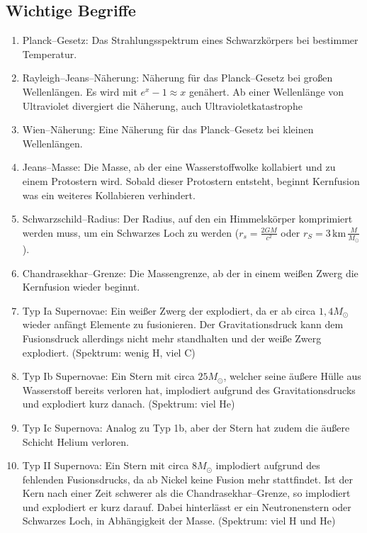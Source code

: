 \documentclass[a4paper,12pt]{article}
\numberwithin{equation}{section}
\begin{document}

\newpage


\subsection{Wichtige Begriffe}
\begin{enumerate}[label=$\circ$]
        \item Planck--Gesetz: Das Strahlungsspektrum eines Schwarzkörpers bei bestimmer Temperatur.
        \item Rayleigh--Jeans--Näherung: Näherung für das Planck--Gesetz bei großen Wellenlängen. Es wird mit $e^x-1\approx x$ genähert. Ab einer Wellenlänge von Ultraviolet divergiert die Näherung, auch Ultravioletkatastrophe
        \item Wien--Näherung: Eine Näherung für das Planck--Gesetz bei kleinen Wellenlängen.
        \item Jeans--Masse: Die Masse, ab der eine Wasserstoffwolke kollabiert und zu einem Protostern wird. Sobald dieser Protostern entsteht, beginnt Kernfusion was ein weiteres Kollabieren verhindert.
        \item Schwarzschild--Radius: Der Radius, auf den ein Himmelskörper komprimiert werden muss, um ein Schwarzes Loch zu werden ($r_s=\tfrac{2GM}{c^2}$ oder $r_S=3\,\text{km}\,\tfrac{M}{M_\odot}$).
        \item Chandrasekhar--Grenze: Die Massengrenze, ab der in einem weißen Zwerg die Kernfusion wieder beginnt.
        \item Typ Ia Supernovae: Ein weißer Zwerg der explodiert, da er ab circa $1,4M_\odot$ wieder anfängt Elemente zu fusionieren. Der Gravitationsdruck kann dem Fusionsdruck allerdings nicht mehr standhalten und der weiße Zwerg explodiert. (Spektrum: wenig H, viel C)
        \item Typ Ib Supernovae: Ein Stern mit circa $25M_\odot$, welcher seine äußere Hülle aus Wasserstoff bereits verloren hat, implodiert aufgrund des Gravitationsdrucks und explodiert kurz danach. (Spektrum: viel He)
        \item Typ Ic Supernova: Analog zu Typ 1b, aber der Stern hat zudem die äußere Schicht Helium verloren.
        \item Typ II Supernova: Ein Stern mit circa $8M_\odot$ implodiert aufgrund des fehlenden Fusionsdrucks, da ab Nickel keine Fusion mehr stattfindet. Ist der Kern nach einer Zeit schwerer als die Chandrasekhar--Grenze, so implodiert und explodiert er kurz darauf. Dabei hinterlässt er ein Neutronenstern oder Schwarzes Loch, in Abhängigkeit der Masse. (Spektrum: viel H und He)

\end{enumerate}
\end{document}
